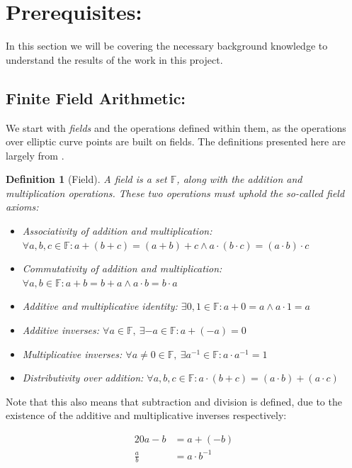 \documentclass{article}
\newtheorem{definition}{Definition}[section]
\newcommand{\eq}[1]{\begin{alignat*}{20}#1\end{alignat*}}
\newcommand{\F}{\mathbb{F}}
\begin{document}
\section{Prerequisites:} \label{prerequisites}

In this section we will be covering the necessary background knowledge
to understand the results of the work in this project.

\subsection{Finite Field Arithmetic:} \label{finite-field-arithmetic}

We start with \textit{fields} and the operations defined within them,
as the operations over elliptic curve points are built on fields. The
definitions presented here are largely from \cite{elliptic-curves}.

\begin{definition}[Field]
	A field is a set $\F$, along with the \textit{addition} and
	\textit{multiplication} operations. These two operations must
	uphold the so-called \textit{field axioms}:

	\begin{itemize}
		\item Associativity of addition and multiplication:
		$\forall a,b,c \in \F : a + (b + c) = (a + b) + c \land a \cdot (b \cdot c) = (a \cdot b) \cdot c$
		\item Commutativity of addition and multiplication:
		$\forall a,b \in \F : a+b=b+a \land a \cdot b = b \cdot a$
		\item Additive and multiplicative identity:
		$\exists 0,1 \in \F : a + 0 = a \land a \cdot 1 = a$
		\item Additive inverses:
		$\forall a \in \F,\ \exists {-a} \in \F : a + ({-a}) = 0$
		\item Multiplicative inverses:
		$\forall a \neq 0 \in \F,\  \exists a^{-1} \in \F : a \cdot a^{-1} = 1$
		\item Distributivity over addition:
		$\forall a,b,c \in \F : a \cdot (b + c) = (a \cdot b) + (a \cdot c)$
	\end{itemize}
\end{definition}

Note that this also means that subtraction and division is defined,
due to the existence of the additive and multiplicative inverses
respectively:

\eq{
	a-b         &= a + (-b) \\
	\frac{a}{b} &= a \cdot b^{-1}
}
\end{document}
